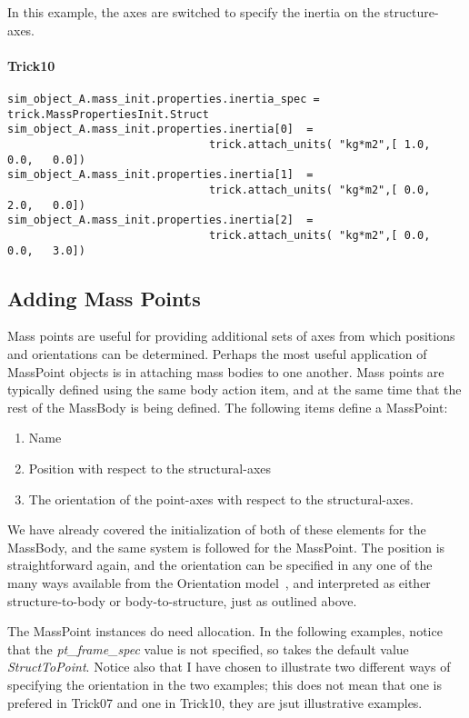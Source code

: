 In this example, the axes are switched to specify the inertia on the
structure-axes.
\paragraph{Trick10}
\begin{verbatim}
sim_object_A.mass_init.properties.inertia_spec =
trick.MassPropertiesInit.Struct
sim_object_A.mass_init.properties.inertia[0]  =
                               trick.attach_units( "kg*m2",[ 1.0,  0.0,   0.0])
sim_object_A.mass_init.properties.inertia[1]  =
                               trick.attach_units( "kg*m2",[ 0.0,  2.0,   0.0])
sim_object_A.mass_init.properties.inertia[2]  =
                               trick.attach_units( "kg*m2",[ 0.0,  0.0,   3.0])

\end{verbatim}


\subsection{Adding Mass Points}
Mass points are useful for providing additional sets of axes from which
positions and orientations can be determined.  Perhaps the most useful
application of MassPoint objects is in attaching mass bodies to one another.
Mass points are typically defined using the same body action item, and at the
same time that the rest of the MassBody is being defined.  The following items
define a MassPoint:
 \begin{enumerate}
   \item Name
   \item Position with respect to the structural-axes
   \item The orientation of the point-axes with respect to the
   structural-axes.
   \end{enumerate}

We have already covered the initialization of both of these elements for the
MassBody, and the same system is followed for the MassPoint.  The position is
straightforward again, and the orientation can be specified in any one of the
many ways available from the Orientation model~\cite{dynenv:ORIENTATION}, and
interpreted as either structure-to-body or body-to-structure, just as outlined
above.

The MassPoint instances do need allocation.  In the following examples, notice
that the \textit{pt\_frame\_spec} value is not specified, so takes the default
value \textit{StructToPoint}.  Notice also that I have chosen to illustrate
two different ways of specifying the orientation in the two examples; this
does not mean that one is prefered in Trick07 and one in Trick10, they are
jsut illustrative examples.

